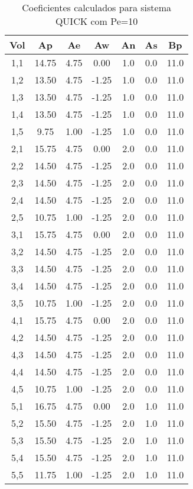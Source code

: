 \documentclass[]{article}
\begin{document}
\begin{table}[H]
	\centering
	\begin{tabular}{|c|c|c|c|c|c|c|}
		\hline
		\textbf{Vol} & \textbf{Ap} & \textbf{Ae} & \textbf{Aw} & \textbf{An} & \textbf{As} & \textbf{Bp} \\
		\hline
		1,1  & 14.75  & 4.75  & 0.00  & 1.0  & 0.0  & 11.0 \\
		1,2  & 13.50  & 4.75  & -1.25 & 1.0  & 0.0  & 11.0 \\
		1,3  & 13.50  & 4.75  & -1.25 & 1.0  & 0.0  & 11.0 \\
		1,4  & 13.50  & 4.75  & -1.25 & 1.0  & 0.0  & 11.0 \\
		1,5  & 9.75   & 1.00  & -1.25 & 1.0  & 0.0  & 11.0 \\
		2,1  & 15.75  & 4.75  & 0.00  & 2.0  & 0.0  & 11.0 \\
		2,2  & 14.50  & 4.75  & -1.25 & 2.0  & 0.0  & 11.0 \\
		2,3  & 14.50  & 4.75  & -1.25 & 2.0  & 0.0  & 11.0 \\
		2,4  & 14.50  & 4.75  & -1.25 & 2.0  & 0.0  & 11.0 \\
		2,5  & 10.75  & 1.00  & -1.25 & 2.0  & 0.0  & 11.0 \\
		3,1  & 15.75  & 4.75  & 0.00  & 2.0  & 0.0  & 11.0 \\
		3,2  & 14.50  & 4.75  & -1.25 & 2.0  & 0.0  & 11.0 \\
		3,3  & 14.50  & 4.75  & -1.25 & 2.0  & 0.0  & 11.0 \\
		3,4  & 14.50  & 4.75  & -1.25 & 2.0  & 0.0  & 11.0 \\
		3,5  & 10.75  & 1.00  & -1.25 & 2.0  & 0.0  & 11.0 \\
		4,1  & 15.75  & 4.75  & 0.00  & 2.0  & 0.0  & 11.0 \\
		4,2  & 14.50  & 4.75  & -1.25 & 2.0  & 0.0  & 11.0 \\
		4,3  & 14.50  & 4.75  & -1.25 & 2.0  & 0.0  & 11.0 \\
		4,4  & 14.50  & 4.75  & -1.25 & 2.0  & 0.0  & 11.0 \\
		4,5  & 10.75  & 1.00  & -1.25 & 2.0  & 0.0  & 11.0 \\
		5,1  & 16.75  & 4.75  & 0.00  & 2.0  & 1.0  & 11.0 \\
		5,2  & 15.50  & 4.75  & -1.25 & 2.0  & 1.0  & 11.0 \\
		5,3  & 15.50  & 4.75  & -1.25 & 2.0  & 1.0  & 11.0 \\
		5,4  & 15.50  & 4.75  & -1.25 & 2.0  & 1.0  & 11.0 \\
		5,5  & 11.75  & 1.00  & -1.25 & 2.0  & 1.0  & 11.0 \\
		\hline
	\end{tabular}
	\caption{Coeficientes calculados para sistema QUICK com Pe=10}
\end{table}
\end{document}
